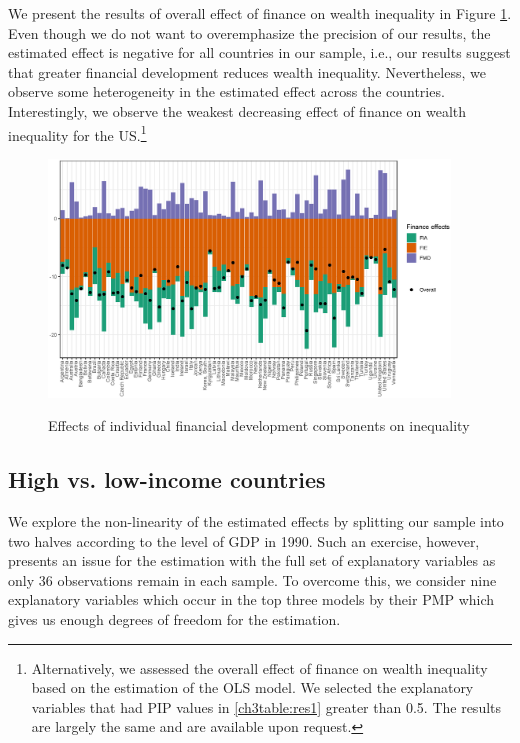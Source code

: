 \begin{refsection}
We present the results of overall effect of finance on wealth inequality in Figure \ref{ch3fig:finance_effect}. Even though we do not want to overemphasize the precision of our results, the estimated effect is negative for all countries in our sample, i.e., our results suggest that greater financial development reduces wealth inequality. Nevertheless, we observe some heterogeneity in the estimated effect across the countries. Interestingly, we observe the weakest decreasing effect of finance on wealth inequality for the \ac{US}.\footnote{Alternatively, we assessed the overall effect of finance on wealth inequality based on the estimation of the \ac{OLS} model. We selected the explanatory variables that had \ac{PIP} values in \ref{ch3table:res1} greater than 0.5. The results are largely the same and are available upon request.}

\begin{figure}
\begin{center}
\caption{Effects of individual financial development components on inequality}
\includegraphics[width=0.95\textwidth]{figures/ch3/finance_effect.eps}
\label{ch3fig:finance_effect}
\end{center}
\end{figure}

\subsection{High vs. low-income countries}
We explore the non-linearity of the estimated effects by splitting our sample into two halves according to the level of GDP in 1990. Such an exercise, however, presents an issue for the estimation with the full set of explanatory variables as only 36 observations remain in each sample. To overcome this, we consider nine explanatory variables which occur in the top three models by their \ac{PMP} which gives us enough degrees of freedom for the estimation. 


\end{refsection}
